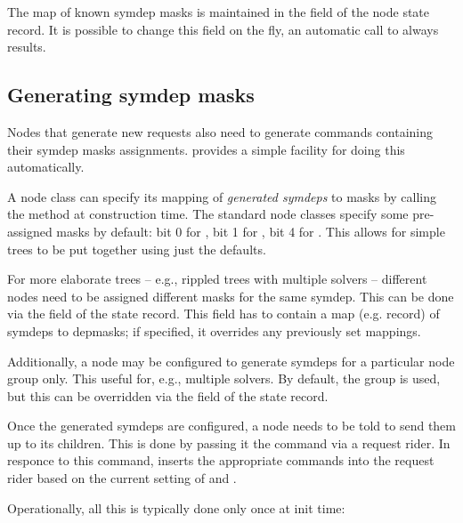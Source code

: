   The map of known symdep masks is maintained in the  field of
  the node state record. It is possible to change this field on the fly, an
  automatic call to  always results.

\subsection{Generating symdep masks}

  Nodes that generate new requests also need to generate 
  commands containing their symdep masks assignments.  provides a
  simple facility for doing this automatically.
  
  A node class can specify its mapping of {\em generated symdeps} to masks
  by calling the  method at construction time. The standard
  node classes specify some pre-assigned masks by default: bit 0 for
  , bit 1 for , bit 4 for . This
  allows for simple trees to be put together using just the defaults.
  
  For more elaborate trees -- e.g., rippled trees with multiple solvers --
  different  nodes need to be assigned different masks for the same
  symdep. This can be done via the  field of the state record.
  This field has to contain a map (e.g. record) of symdeps to depmasks; if
  specified, it overrides any previously set mappings. 
  
  Additionally, a node may be configured to generate symdeps for a particular
  node group only. This useful for, e.g., multiple solvers. By default, the
   group is used, but this can be overridden via the
   field of the state record.

  Once the generated symdeps are configured, a node needs to be told to send
  them up to its children. This is done by passing it the 
  command via a request rider. In responce to this command,
   inserts the appropriate  commands
  into the request rider based on the current setting of  and
  .
  
  Operationally, all this is typically done only once at init time:
  
